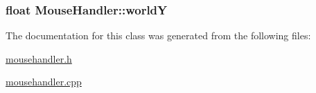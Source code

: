\subsubsection[{world\+Y}]{\setlength{\rightskip}{0pt plus 5cm}float Mouse\+Handler\+::world\+Y\hspace{0.3cm}{\ttfamily [private]}}\label{classMouseHandler_ab3a5274610896b90da3adf48345cfa3a}


The documentation for this class was generated from the following files\+:\begin{DoxyCompactItemize}
\item 
\hyperlink{mousehandler_8h}{mousehandler.\+h}\item 
\hyperlink{mousehandler_8cpp}{mousehandler.\+cpp}\end{DoxyCompactItemize}
